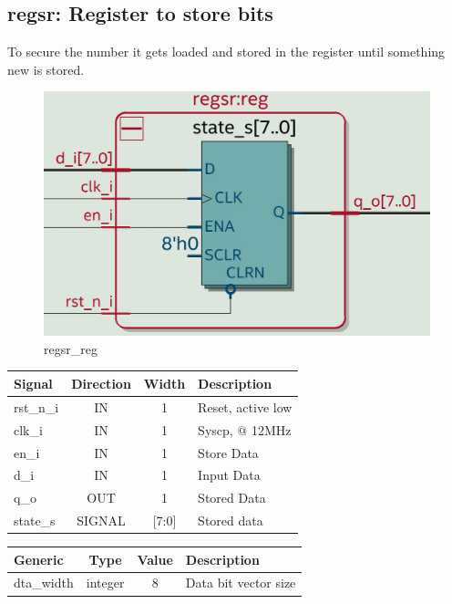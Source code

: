 \documentclass[12pt,a4 paper] {report}
\begin{document}
\subsection{regsr: Register to store bits}
To secure the number it gets loaded and stored in the register until something new is stored.
\begin{figure}[h]
	\centering	
	\includegraphics[scale=0.15]{../png/regsr_reg.png}
	\caption{regsr\_reg}
\end{figure}
\begin{center}
	\begin{tabular}{ | p{2cm} | c | c | p{5cm} |}
		\hline
		\textbf{Signal} & \textbf{Direction} & \textbf{Width} & \textbf{Description} \\
		\hline
		\hline
 		rst\_n\_i & IN & 1 & Reset, active low \\
 		\hline
		clk\_i & IN & 1 & Syscp, @ 12MHz \\
		\hline
		en\_i & IN & 1 & Store Data \\
		\hline
		d\_i & IN & 1 & Input Data \\
		\hline
		q\_o & OUT & 1 & Stored Data \\
		\hline
		\hline
		state\_s & SIGNAL & [7:0] & Stored  data \\
		\hline
	\end{tabular}
\end{center}
\begin{center}
	\begin{tabular}{| p{2cm} | c | c | p{5cm} |}
	\hline
	\textbf{Generic} & \textbf{Type} & \textbf{Value} & \textbf{Description} \\
	\hline
	dta\_width & integer & 8 & Data bit vector size \\
	\hline
	\end{tabular}
\end{center}
\end{document}
